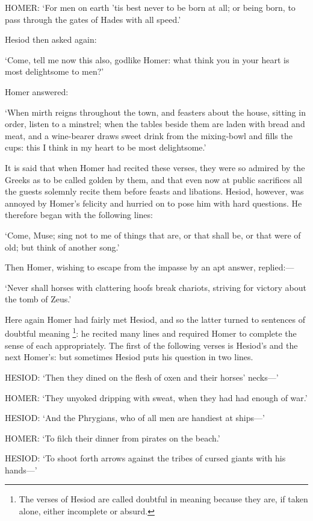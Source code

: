 HOMER: ‘For men on earth ’tis best never to be born at all; or
being born, to pass through the gates of Hades with all speed.’

Hesiod then asked again:

‘Come, tell me now this also, godlike Homer: what think you in your heart
is most delightsome to men?’

Homer answered:

‘When mirth reigns throughout the town, and feasters about the house,
sitting in order, listen to a minstrel; when the tables beside them are laden
with bread and meat, and a wine-bearer draws sweet drink from the mixing-bowl
and fills the cups: this I think in my heart to be most delightsome.’

It is said that when Homer had recited these verses, they were so admired by
the Greeks as to be called golden by them, and that even now at public
sacrifices all the guests solemnly recite them before feasts and libations.
Hesiod, however, was annoyed by Homer’s felicity and hurried on to pose
him with hard questions. He therefore began with the following lines:

‘Come, Muse; sing not to me of things that are, or that shall be, or that
were of old; but think of another song.’

Then Homer, wishing to escape from the impasse by an apt answer,
replied:—

‘Never shall horses with clattering hoofs break chariots, striving for
victory about the tomb of Zeus.’

Here again Homer had fairly met Hesiod, and so the latter turned to sentences
of doubtful meaning \footnote{The verses of Hesiod are
called doubtful in meaning because they are, if taken alone, either incomplete
or absurd.}: he recited many lines and
required Homer to complete the sense of each appropriately. The first of the
following verses is Hesiod’s and the next Homer’s: but sometimes
Hesiod puts his question in two lines.

HESIOD: ‘Then they dined on the flesh of oxen and their horses’
necks—’

HOMER: ‘They unyoked dripping with sweat, when they had had enough of
war.’

HESIOD: ‘And the Phrygians, who of all men are handiest at
ships—’

HOMER: ‘To filch their dinner from pirates on the beach.’

HESIOD: ‘To shoot forth arrows against the tribes of cursed giants with
his hands—’

